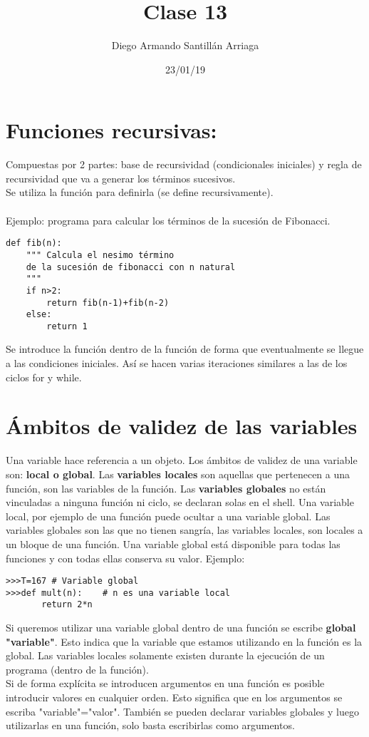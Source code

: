 \documentclass[letterpaper, 12pt, oneside]{article}%
\title{\Huge Clase 13}
\author{Diego Armando Santillán Arriaga}
\date{23/01/19}
\begin{document}
	\maketitle
	\newpage
	
\section{Funciones recursivas:}
Compuestas por 2 partes: base de recursividad (condicionales iniciales) y regla de recursividad que va a generar los términos sucesivos.
\\
Se utiliza la función para definirla (se define recursivamente). 
\\\\
Ejemplo: programa para calcular los términos de la sucesión de Fibonacci. 
\begin{verbatim}
def fib(n):
    """ Calcula el nesimo término
    de la sucesión de fibonacci con n natural
    """
    if n>2:
        return fib(n-1)+fib(n-2)
    else:
        return 1
\end{verbatim}
Se introduce la función dentro de la función de forma que eventualmente se llegue a las condiciones iniciales. Así se hacen varias iteraciones similares a las de los ciclos for y while.

\section{Ámbitos de validez de las variables}

Una variable hace referencia a un objeto. Los ámbitos de validez de una variable son: \textbf{local o global}. Las \textbf{variables locales} son aquellas que pertenecen a una función, son las variables de la función. Las \textbf{variables globales} no están vinculadas a ninguna función ni ciclo, se declaran solas en el shell. 
Una variable local, por ejemplo de una función puede ocultar a una variable global.  
Las variables globales son las que no tienen sangría, las variables locales, son locales a un bloque de una función. Una variable global está disponible para todas las funciones y con todas ellas conserva su valor. Ejemplo:
\begin{verbatim}
>>>T=167 # Variable global
>>>def mult(n):    # n es una variable local
       return 2*n    
\end{verbatim}
Si queremos utilizar una variable global dentro de una función se escribe \textbf{global "variable"}. Esto indica que la variable que estamos utilizando en la función es la global. 
Las variables locales solamente existen durante la ejecución de un programa (dentro de la función).
\\
Si de forma explícita se introducen argumentos en una función es posible introducir valores en cualquier orden. Esto significa que en los argumentos se escriba "variable"="valor". También se pueden declarar variables globales y luego utilizarlas en una función, solo basta escribirlas como argumentos. 
\end{document}
